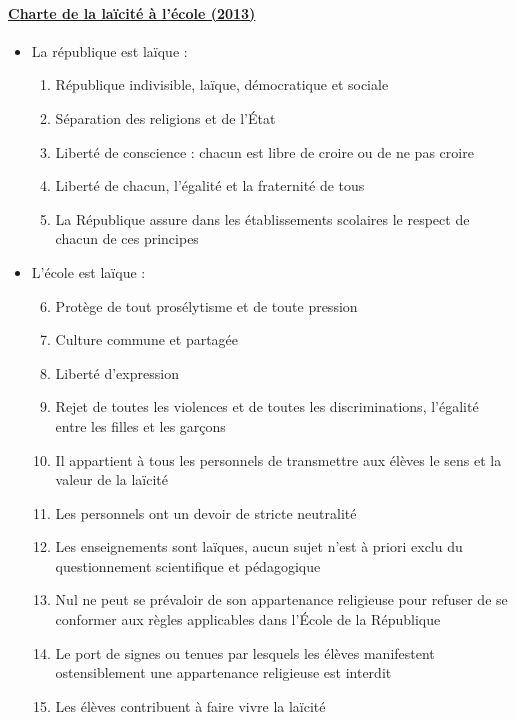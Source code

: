 \documentclass[10pt,french,twocolumn,landscape,a4paper]{article}
\begin{document}
\pagestyle{empty}

\paragraph{\href{http://eduscol.education.fr/cid73652/charte-de-la-laicite-a-l-ecole.html}{Charte de la laïcité à l’école (2013)}}
\begin{itemize}
\item La république est laïque :
	\begin{enumerate}
	\item République indivisible, laïque, démocratique et sociale
	\item Séparation des religions et de l’État
	\item Liberté de conscience : chacun est libre de croire ou de ne pas croire
	\item Liberté de chacun, l’égalité et la fraternité de tous
	\item La République assure dans les établissements scolaires le respect de chacun de ces principes
	\end{enumerate}
\item L’école est laïque :
	\begin{enumerate}
	\setcounter{enumi}{5}
	\item Protège de tout prosélytisme et de toute pression
	\item Culture commune et partagée
	\item Liberté d’expression
	\item Rejet de toutes les violences et de toutes les discriminations, l’égalité entre les filles et les garçons
	\item Il appartient à tous les personnels de transmettre aux élèves le sens et la valeur de la laïcité
	\item Les personnels ont un devoir de stricte neutralité
	\item Les enseignements sont laïques, aucun sujet n’est à priori exclu du questionnement scientifique et pédagogique
	\item Nul ne peut se prévaloir de son appartenance religieuse pour refuser de se conformer aux règles applicables dans l'École de la République
	\item Le port de signes ou tenues par lesquels les élèves manifestent ostensiblement une appartenance religieuse est interdit
	\item Les élèves contribuent à faire vivre la laïcité
	\end{enumerate}
\end{itemize}
\end{document}
